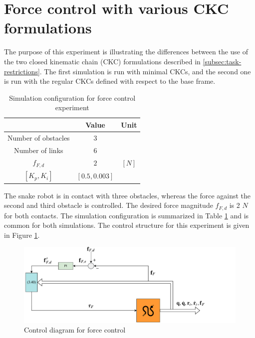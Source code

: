 \section{Force control with various CKC formulations}\label{sec:2xminiJforce}

The purpose of this experiment is illustrating the differences between the use of the two closed kinematic chain (CKC) formulations described in \ref{subsec:task-restrictions}. The first simulation is run with minimal CKCs, and the second one is run with the regular CKCs defined with respect to the base frame.

\begin{table}[h!]
    \centering
    \begin{tabular}{|c|c|c|}
        \hline
        & \textbf{Value} & \textbf{Unit}\\
        \hline \hline
        Number of obstacles & $3$ & \\
        Number of links & $6$ & \\
        $f_{F,d}$ & $2$ & $[N]$ \\
        $[K_{p}, K_{i}]$ & $[0.5, 0.003]$ &\\
        \hline
    \end{tabular}
    \caption{Simulation configuration for force control experiment}
    \label{tab:exp_2xf}
\end{table}

The snake robot is in contact with three obstacles, whereas the force against the second and third obstacle is controlled. The desired force magnitude $f_{F,d}$ is 2 $N$ for both contacts. The simulation configuration is summarized in Table \ref{tab:exp_2xf} and is common for both simulations. The control structure for this experiment is given in Figure \ref{fig:diag-f}.



\begin{figure}[h!]
    \centering
    \includegraphics[trim=0cm 0cm 3cm 0cm, clip=true, width=\textwidth]{figures/experiments/control-diagrams/2f-control-diagram.pdf}
    \caption{Control diagram for force control}
    \label{fig:diag-f}
\end{figure}

